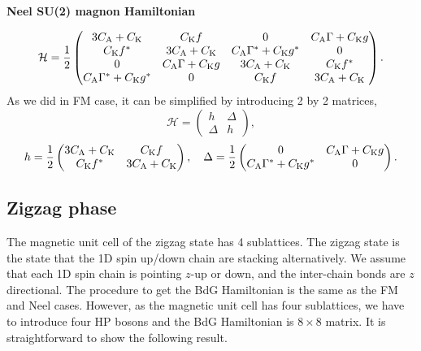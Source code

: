 \documentclass[11pt, aps, longbibliography]{article}
\begin{document}
\begin{tcolorbox}
    \textbf{Neel SU(2) magnon Hamiltonian}

    \begin{equation}
        \mathcal{H} = \frac{1}{2}\begin{pmatrix}
            3C_{\rm A}+C_{\rm K} & C_{\rm K}f & 0 & C_{\rm A}\Gamma + C_{\rm K}g \\
            C_{\rm K}f^* & 3C_{\rm A}+C_{\rm K} & C_{\rm A}\Gamma^* + C_{\rm K}g^*  & 0 \\
            0 & C_{\rm A}\Gamma + C_{\rm K}g & 3C_{\rm A}+C_{\rm K} & C_{\rm K}f^* \\
            C_{\rm A}\Gamma^* + C_{\rm K}g^* & 0 & C_{\rm K}f & 3C_{\rm A}+C_{\rm K} 
        \end{pmatrix}.
    \end{equation}
    As we did in FM case, it can be simplified by introducing 2 by 2 matrices,
    \begin{equation}
        \mathcal{H} = \begin{pmatrix}
            h & \Delta \\
            \Delta & h
        \end{pmatrix},
    \end{equation}
    \begin{equation}
        h = \frac{1}{2}\begin{pmatrix}
            3C_{\rm A}+C_{\rm K} & C_{\rm K}f \\ C_{\rm K}f^* & 3C_{\rm A}+C_{\rm K}
        \end{pmatrix}, \quad \Delta = \frac{1}{2}\begin{pmatrix}
            0 & C_{\rm A}\Gamma + C_{\rm K}g \\ C_{\rm A}\Gamma^* + C_{\rm K}g^* & 0
        \end{pmatrix}.
    \end{equation}
\end{tcolorbox}

\subsection{Zigzag phase}
The magnetic unit cell of the zigzag state has 4 sublattices. 
The zigzag state is the state that the 1D spin up/down chain are stacking alternatively.
We assume that each 1D spin chain is pointing $z$-up or down, and the inter-chain bonds are $z$ directional.
The procedure to get the BdG Hamiltonian is the same as the FM and Neel cases. 
However, as the magnetic unit cell has four sublattices, we have to introduce four HP bosons and 
the BdG Hamiltonian is $8\times8$ matrix.
It is straightforward to show the following result.
\end{document}
